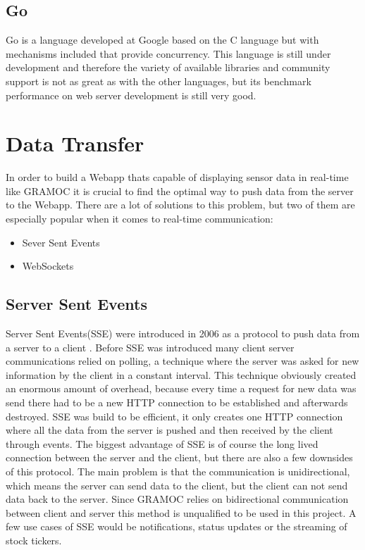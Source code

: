 \subsection{Go}
Go is a language developed at Google based on the C language but with mechanisms included that provide concurrency. This language is still under development and therefore the variety of available libraries and community support is not as great as with the other languages, but its benchmark performance on web server development is still very good.

\section{Data Transfer}
In order to build a Webapp thats capable of displaying sensor data in real-time like GRAMOC it is crucial to find the optimal way to push data from the server to the Webapp. There are a lot of solutions to this problem, but two of them are especially popular when it comes to real-time communication:

\begin{itemize}
    \item Sever Sent Events
    \item WebSockets
\end{itemize}

\subsection{Server Sent Events}
\label{subsec:sse}
Server Sent Events(SSE) were introduced in 2006 as a protocol to push data from a server to a client \autocite{sse}. Before SSE was introduced many client server communications relied on polling, a technique where the server was asked for new information by the client in a constant interval. This technique obviously created an enormous amount of overhead, because every time a request for new data was send there had to be a new HTTP connection to be established and afterwards destroyed. SSE was build to be efficient, it only creates one HTTP connection where all the data from the server is pushed and then received by the client through events. The biggest advantage of SSE is of course the long lived connection between the server and the client, but there are also a few downsides of this protocol. The main problem is that the communication is unidirectional, which means the server can send data to the client, but the client can not send data back to the server. Since GRAMOC relies on bidirectional communication between client and server this method is unqualified to be used in this project. A few use cases of SSE would be notifications, status updates or the streaming of stock tickers.

